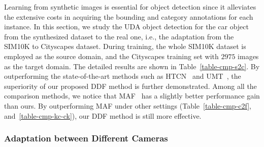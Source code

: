 \documentclass[journal]{IEEEtran}
\begin{document}
Learning from synthetic images is essential for object detection since it alleviates the extensive costs in acquiring the bounding and category annotations for each instance. In this section, we study the UDA object detection for the car object from the synthesized dataset to the real one, i.e., the adaptation from the SIM10K to Cityscapes dataset. During training, the whole SIM10K dataset is employed as the source domain, and the Cityscapes training set with $2975$ images as the target domain. The detailed results are shown in Table~\ref{table-cmp-s2c}. By outperforming the state-of-the-art methods such as HTCN~\cite{chen2020harmonizing} and UMT~\cite{deng2021unbiased}, the superiority of our proposed DDF method is further demonstrated. Among all the comparison methods, we notice that MAF~\cite{he2019multi} has a slightly better performance gain than ours. By outperforming MAF under other settings (Table~\ref{table-cmp-c2f}, and~\ref{table-cmp-kc-ck}), our DDF method is still more effective.



\subsubsection{Adaptation between Different Cameras}

\begin{table}[!htb]
\centering
\caption{Quantitative comparison with state-of-the-art methods on the UDA object detection tasks between the KITTI and Cityscapes datasets. $K \to C$ represents adaptation from the KITTI to the Cityscapes dataset, and vice versa.}
\label{table-cmp-kc-ck}
\end{table}
\end{document}
